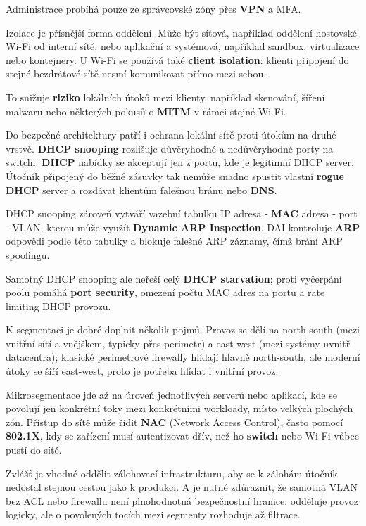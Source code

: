 \documentclass[11pt,a4paper]{article}
\begin{document}
Administrace probíhá pouze ze správcovské zóny přes \textbf{VPN} a MFA.

Izolace je přísnější forma oddělení. Může být síťová, například oddělení hostovské Wi-Fi od interní sítě, nebo aplikační a systémová, například sandbox, virtualizace nebo kontejnery. U Wi-Fi se používá také \textbf{client isolation}: klienti připojení do stejné bezdrátové sítě nesmí komunikovat přímo mezi sebou.

To snižuje \textbf{riziko} lokálních útoků mezi klienty, například skenování, šíření malwaru nebo některých pokusů o \textbf{MITM} v rámci stejné Wi-Fi.

Do bezpečné architektury patří i ochrana lokální sítě proti útokům na druhé vrstvě. \textbf{DHCP snooping} rozlišuje důvěryhodné a nedůvěryhodné porty na switchi. \textbf{DHCP} nabídky se akceptují jen z portu, kde je legitimní DHCP server. Útočník připojený do běžné zásuvky tak nemůže snadno spustit vlastní \textbf{rogue DHCP} server a rozdávat klientům falešnou bránu nebo \textbf{DNS}.

DHCP snooping zároveň vytváří vazební tabulku IP adresa - \textbf{MAC} adresa - port - VLAN, kterou může využít \textbf{Dynamic ARP Inspection}. DAI kontroluje \textbf{ARP} odpovědi podle této tabulky a blokuje falešné ARP záznamy, čímž brání ARP spoofingu.

Samotný DHCP snooping ale neřeší celý \textbf{DHCP starvation}; proti vyčerpání poolu pomáhá \textbf{port security}, omezení počtu MAC adres na portu a rate limiting DHCP provozu.

K segmentaci je dobré doplnit několik pojmů. Provoz se dělí na north-south (mezi vnitřní sítí a vnějškem, typicky přes perimetr) a east-west (mezi systémy uvnitř datacentra); klasické perimetrové firewally hlídají hlavně north-south, ale moderní útoky se šíří east-west, proto je potřeba hlídat i vnitřní provoz.

Mikrosegmentace jde až na úroveň jednotlivých serverů nebo aplikací, kde se povolují jen konkrétní toky mezi konkrétními workloady, místo velkých plochých zón. Přístup do sítě může řídit \textbf{NAC} (Network Access Control), často pomocí \textbf{802.1X}, kdy se zařízení musí autentizovat dřív, než ho \textbf{switch} nebo Wi-Fi vůbec pustí do sítě.

Zvlášť je vhodné oddělit zálohovací infrastrukturu, aby se k zálohám útočník nedostal stejnou cestou jako k produkci. A je nutné zdůraznit, že samotná VLAN bez ACL nebo firewallu není plnohodnotná bezpečnostní hranice: odděluje provoz logicky, ale o povolených tocích mezi segmenty rozhoduje až filtrace.
\end{document}

